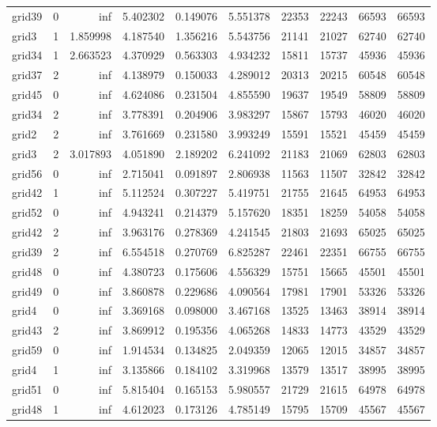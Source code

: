 \begin{longtable}{|l|r|r|r|r|r|r|r|r|r|}
grid39 & 0 & inf & 5.402302 & 0.149076 & 5.551378 & 22353 & 22243 & 66593 & 66593 \\
grid3 & 1 & 1.859998 & 4.187540 & 1.356216 & 5.543756 & 21141 & 21027 & 62740 & 62740 \\
grid34 & 1 & 2.663523 & 4.370929 & 0.563303 & 4.934232 & 15811 & 15737 & 45936 & 45936 \\
grid37 & 2 & inf & 4.138979 & 0.150033 & 4.289012 & 20313 & 20215 & 60548 & 60548 \\
grid45 & 0 & inf & 4.624086 & 0.231504 & 4.855590 & 19637 & 19549 & 58809 & 58809 \\
grid34 & 2 & inf & 3.778391 & 0.204906 & 3.983297 & 15867 & 15793 & 46020 & 46020 \\
grid2 & 2 & inf & 3.761669 & 0.231580 & 3.993249 & 15591 & 15521 & 45459 & 45459 \\
grid3 & 2 & 3.017893 & 4.051890 & 2.189202 & 6.241092 & 21183 & 21069 & 62803 & 62803 \\
grid56 & 0 & inf & 2.715041 & 0.091897 & 2.806938 & 11563 & 11507 & 32842 & 32842 \\
grid42 & 1 & inf & 5.112524 & 0.307227 & 5.419751 & 21755 & 21645 & 64953 & 64953 \\
grid52 & 0 & inf & 4.943241 & 0.214379 & 5.157620 & 18351 & 18259 & 54058 & 54058 \\
grid42 & 2 & inf & 3.963176 & 0.278369 & 4.241545 & 21803 & 21693 & 65025 & 65025 \\
grid39 & 2 & inf & 6.554518 & 0.270769 & 6.825287 & 22461 & 22351 & 66755 & 66755 \\
grid48 & 0 & inf & 4.380723 & 0.175606 & 4.556329 & 15751 & 15665 & 45501 & 45501 \\
grid49 & 0 & inf & 3.860878 & 0.229686 & 4.090564 & 17981 & 17901 & 53326 & 53326 \\
grid4 & 0 & inf & 3.369168 & 0.098000 & 3.467168 & 13525 & 13463 & 38914 & 38914 \\
grid43 & 2 & inf & 3.869912 & 0.195356 & 4.065268 & 14833 & 14773 & 43529 & 43529 \\
grid59 & 0 & inf & 1.914534 & 0.134825 & 2.049359 & 12065 & 12015 & 34857 & 34857 \\
grid4 & 1 & inf & 3.135866 & 0.184102 & 3.319968 & 13579 & 13517 & 38995 & 38995 \\
grid51 & 0 & inf & 5.815404 & 0.165153 & 5.980557 & 21729 & 21615 & 64978 & 64978 \\
grid48 & 1 & inf & 4.612023 & 0.173126 & 4.785149 & 15795 & 15709 & 45567 & 45567 \\

\end{longtable}
